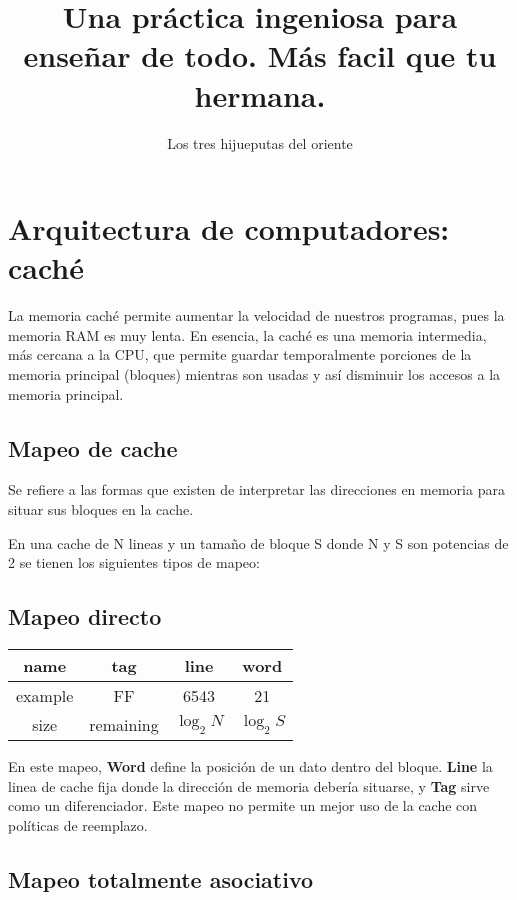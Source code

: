 \documentclass{article}
\title{Una práctica ingeniosa para enseñar de todo. Más facil que tu hermana.}
\author{Los tres hijueputas del oriente}
\begin{document}
	
	
	{\centering \section*{Arquitectura de computadores: caché}}
	
	La memoria caché permite aumentar la velocidad de nuestros programas, pues la memoria RAM es muy lenta. En esencia, la caché es una memoria intermedia, más cercana a la CPU, que permite guardar temporalmente porciones de la memoria principal (bloques) mientras son usadas y así disminuir los accesos a la memoria principal.
	
	\setcounter{section}{0}
	
	\begin{multicols}{2}
		\section{Mapeo de cache}
		
		Se refiere a las formas que existen de interpretar las direcciones en memoria para situar sus bloques en la cache.
		
		En una cache de N lineas y un tamaño de bloque S donde N y S son potencias de 2 se tienen los siguientes tipos de mapeo:
		
		\subsection{Mapeo directo}
		
		\begin{center}
			\begin{tabular}{|c|c|c|c|}
				\hline
				name & tag & line & word \\
				\hline
				example & FF & 6543 & 21 \\
				\hline
				size & remaining & $\log_2N$ & $\log_2S$ \\
				\hline
			\end{tabular}
		\end{center}
		
		En este mapeo, \textbf{Word} define la posición de un dato dentro del bloque. \textbf{Line} la linea de cache fija donde la dirección de memoria debería situarse, y \textbf{Tag} sirve como un diferenciador. Este mapeo no permite un mejor uso de la cache con políticas de reemplazo.
		
		\subsection{Mapeo totalmente asociativo}
		

\end{multicols}
\end{document}
